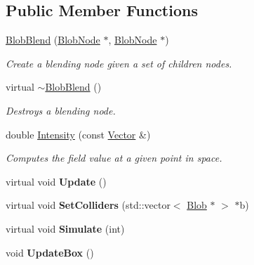 \subsection*{Public Member Functions}
\begin{DoxyCompactItemize}
\item 
\hypertarget{class_blob_blend_a134f44336ec248ba777cfdfd1f432eaa}{
\hyperlink{class_blob_blend_a134f44336ec248ba777cfdfd1f432eaa}{BlobBlend} (\hyperlink{class_blob_node}{BlobNode} $\ast$, \hyperlink{class_blob_node}{BlobNode} $\ast$)}
\label{class_blob_blend_a134f44336ec248ba777cfdfd1f432eaa}

\begin{DoxyCompactList}\small\item\em Create a blending node given a set of children nodes. \item\end{DoxyCompactList}\item 
\hypertarget{class_blob_blend_aced26c958ced9a52cd8bcefeedfcf8b4}{
virtual \hyperlink{class_blob_blend_aced26c958ced9a52cd8bcefeedfcf8b4}{$\sim$BlobBlend} ()}
\label{class_blob_blend_aced26c958ced9a52cd8bcefeedfcf8b4}

\begin{DoxyCompactList}\small\item\em Destroys a blending node. \item\end{DoxyCompactList}\item 
\hypertarget{class_blob_blend_af6ce836e9bfceb50edae2c13369a87be}{
double \hyperlink{class_blob_blend_af6ce836e9bfceb50edae2c13369a87be}{Intensity} (const \hyperlink{class_vector}{Vector} \&)}
\label{class_blob_blend_af6ce836e9bfceb50edae2c13369a87be}

\begin{DoxyCompactList}\small\item\em Computes the field value at a given point in space. \item\end{DoxyCompactList}\item 
\hypertarget{class_blob_blend_a3502578a89ad71f062a021279654f1a0}{
virtual void {\bfseries Update} ()}
\label{class_blob_blend_a3502578a89ad71f062a021279654f1a0}

\item 
\hypertarget{class_blob_blend_a9aaf51c4f1b79010a75a0fefe0287a59}{
virtual void {\bfseries SetColliders} (std::vector$<$ \hyperlink{class_blob}{Blob} $\ast$ $>$ $\ast$b)}
\label{class_blob_blend_a9aaf51c4f1b79010a75a0fefe0287a59}

\item 
\hypertarget{class_blob_blend_a22c7508782c51a2b9279d7333a8566bc}{
virtual void {\bfseries Simulate} (int)}
\label{class_blob_blend_a22c7508782c51a2b9279d7333a8566bc}

\item 
\hypertarget{class_blob_blend_a971fb2752086abcf7b598e8369c615bf}{
void {\bfseries UpdateBox} ()}
\label{class_blob_blend_a971fb2752086abcf7b598e8369c615bf}

\end{DoxyCompactItemize}


